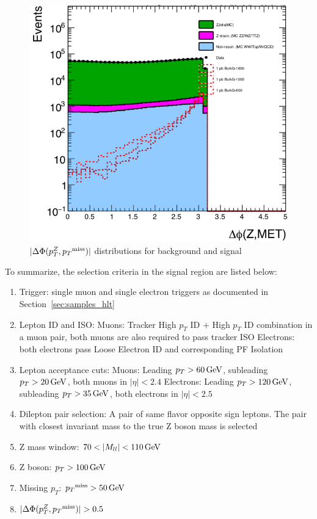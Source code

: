 \begin{figure}[htbp]
\begin{center}
\includegraphics[width=0.75\linewidth]{figures/sel_deltaPhi_ZMET.png}
\caption{$|\Delta \Phi (p_T ^Z ,{p_T}^\text{miss})|$ distributions for background and signal}
\label{fig:sel_deltphi}
\end{center}
\end{figure}


\vspace{0.3cm}
To summarize, the selection criteria in the signal region are listed below:
\begin{enumerate}
\item Trigger: single muon and single electron triggers as documented in Section~\ref{sec:samples_hlt}
\item Lepton ID and ISO:
  \subitem Muons: Tracker High $p_T$ ID $+$ High $p_T$ ID combination in a muon pair, 
  both muons are also required to pass tracker ISO
  \subitem Electrons: both electrons pass Loose Electron ID and corresponding PF Isolation
\item Lepton acceptance cuts:
  \subitem Muons: Leading  $p_T > 60\,\text{Ge\hspace{-.08em}V}$, subleading $p_T > 20\,\text{Ge\hspace{-.08em}V}$, both muons in $|\eta| < 2.4$
  \subitem Electrons: Leading $p_T >120\,\text{Ge\hspace{-.08em}V}$, subleading $p_T >35\,\text{Ge\hspace{-.08em}V}$, both electrons in $|\eta|<2.5$
\item Dilepton pair selection: A pair of same flavor opposite sign
  leptons. The pair with closest invariant mass to the true Z boson mass is selected
\item Z mass window:   $70 < |M_{ll}| < 110\,\text{Ge\hspace{-.08em}V}$
\item Z boson: $p_T >100\,\text{Ge\hspace{-.08em}V}$
\item Missing $p_T$: ${p_T}^\text{miss} > 50\,\text{Ge\hspace{-.08em}V}$
\item $|\Delta \Phi (p_T ^Z ,\ptmiss)|>0.5$
\end{enumerate}

